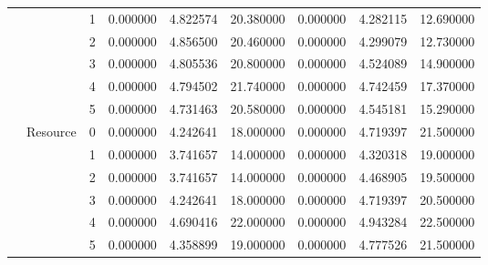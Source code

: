 \begin{tabular}{lllrrrrrr}
 &  & 1 & 0.000000 & 4.822574 & 20.380000 & 0.000000 & 4.282115 & 12.690000 \\
 &  & 2 & 0.000000 & 4.856500 & 20.460000 & 0.000000 & 4.299079 & 12.730000 \\
 &  & 3 & 0.000000 & 4.805536 & 20.800000 & 0.000000 & 4.524089 & 14.900000 \\
 &  & 4 & 0.000000 & 4.794502 & 21.740000 & 0.000000 & 4.742459 & 17.370000 \\
 &  & 5 & 0.000000 & 4.731463 & 20.580000 & 0.000000 & 4.545181 & 15.290000 \\
\cline{2-9}
 & \multirow[t]{6}{*}{Resource} & 0 & 0.000000 & 4.242641 & 18.000000 & 0.000000 & 4.719397 & 21.500000 \\
 &  & 1 & 0.000000 & 3.741657 & 14.000000 & 0.000000 & 4.320318 & 19.000000 \\
 &  & 2 & 0.000000 & 3.741657 & 14.000000 & 0.000000 & 4.468905 & 19.500000 \\
 &  & 3 & 0.000000 & 4.242641 & 18.000000 & 0.000000 & 4.719397 & 20.500000 \\
 &  & 4 & 0.000000 & 4.690416 & 22.000000 & 0.000000 & 4.943284 & 22.500000 \\
 &  & 5 & 0.000000 & 4.358899 & 19.000000 & 0.000000 & 4.777526 & 21.500000 \\
\cline{1-9} \cline{2-9}
\bottomrule
\end{tabular}
